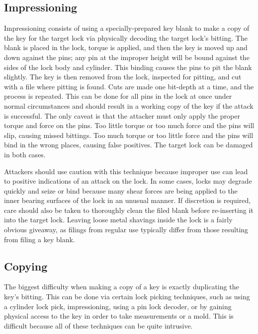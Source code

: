 \documentclass{acm_proc_article-sp}
\begin{document}
\subsection{Impressioning}
Impressioning consists of using a specially-prepared key blank to make a copy of the key for the target lock via physically decoding the target lock's bitting. The blank is placed in the lock, torque is applied, and then the key is moved up and down against the pins; any pin at the improper height will be bound against the sides of the lock body and cylinder. This binding causes the pins to pit the blank slightly. The key is then removed from the lock, inspected for pitting, and cut with a file where pitting is found. Cuts are made one bit-depth at a time, and the process is repeated. This can be done for all pins in the lock at once under normal circumstances and should result in a working copy of the key if the attack is successful. The only caveat is that the attacker must only apply the proper torque and force on the pins. Too little torque or too much force and the pins will slip, causing missed bittings. Too much torque or too little force and the pins will bind in the wrong places, causing false positives. The target lock can be damaged in both cases.

Attackers should use caution with this technique because improper use can lead to positive indications of an attack on the lock. In some cases, locks may degrade quickly and seize or bind because many shear forces are being applied to the inner bearing surfaces of the lock in an unusual manner. If discretion is required, care should also be taken to thoroughly clean the filed blank before re-inserting it into the target lock. Leaving loose metal shavings inside the lock is a fairly obvious giveaway, as filings from regular use typically differ from those resulting from filing a key blank.

\subsection{Copying}
The biggest difficulty when making a copy of a key is exactly duplicating the key's bitting. This can be done via certain lock picking techniques, such as using a cylinder lock pick, impressioning, using a pin lock decoder, or by gaining physical access to the key in order to take measurements or a mold. This is difficult because all of these techniques can be quite intrusive.
\end{document}
